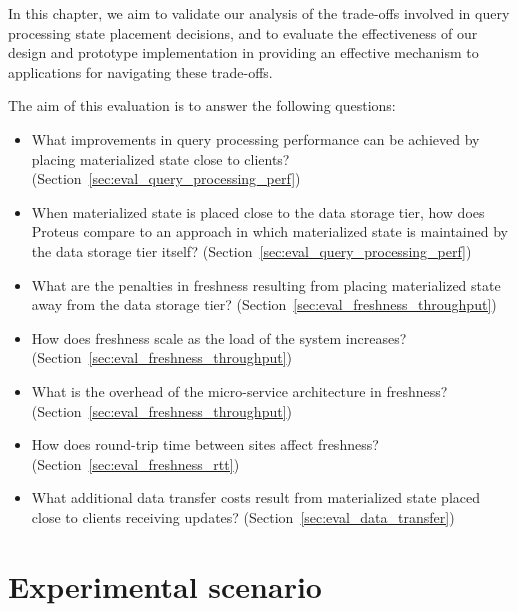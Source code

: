 
In this chapter, we aim to validate our analysis of the trade-offs involved in query processing state placement decisions,
and to evaluate the effectiveness of our design and prototype implementation in providing an effective mechanism to applications
for navigating these trade-offs.

The aim of this evaluation is to answer the following questions:

\begin{itemize}

  \item What improvements in query processing performance can be achieved by placing materialized state close to clients?
  (Section~\ref{sec:eval_query_processing_perf})

  \item When materialized state is placed close to the data storage tier,
  how does Proteus compare to an approach in which materialized state is maintained by the data storage tier itself?
  (Section~\ref{sec:eval_query_processing_perf})

  \item What are the penalties in freshness resulting from placing materialized state away from the data storage tier?
  (Section~\ref{sec:eval_freshness_throughput})

  \item How does freshness scale as the load of the system increases? (Section~\ref{sec:eval_freshness_throughput})

  \item What is the overhead of the micro-service architecture in freshness? (Section~\ref{sec:eval_freshness_throughput})

  \item How does round-trip time between sites affect freshness? (Section~\ref{sec:eval_freshness_rtt})

  \item What additional data transfer costs result from materialized state placed close to clients receiving updates?
  (Section~\ref{sec:eval_data_transfer})

\end{itemize}


\section{Experimental scenario}

